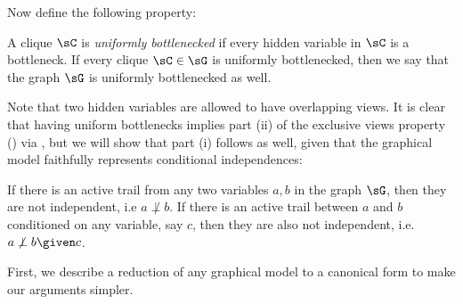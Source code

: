 Now define the following property:
\begin{property}
  \label{prop:bottleneck}
  A clique $\sC$ is \emph{uniformly bottlenecked} if
  every hidden variable in $\sC$ is a bottleneck. 
  If every clique $\sC \in \sG$ is uniformly bottlenecked, then we say
  that the graph $\sG$ is uniformly bottlenecked as well.
\end{property}
Note that two hidden variables are allowed to have overlapping views.
It is clear that having uniform bottlenecks implies part (ii)
of the exclusive views property () via \TensorFactorize,
but we will show that part (i) follows as well, given that the graphical model faithfully represents conditional independences:

\begin{assumption}
  \label{asm:ci}  
  If there is an active trail from any two variables $a, b$ in the graph
    $\sG$, then they are not independent, i.e $a \not\perp b$. 
  If there is an active trail between $a$ and $b$ conditioned on any variable,
    say $c$, then they are also not independent, i.e. $a\not\perp b \given c$.
\end{assumption}



First, we describe a reduction of any graphical model to
  a canonical form to make our arguments simpler.

